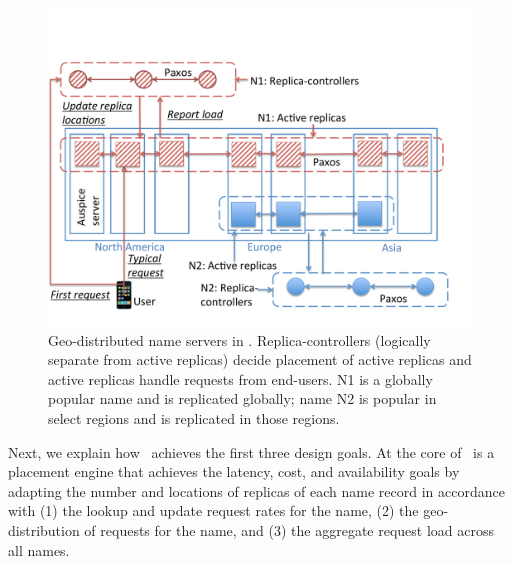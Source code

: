 \begin{figure}[t]
	\centering
	\vspace{-0.3in}
	\includegraphics[scale=0.33]{gns-dns/gnrs.pdf}
	\vspace{-0.15in}
	\caption{Geo-distributed name servers in \auspice.  Replica-controllers  (logically separate from active replicas) decide placement of active replicas and active replicas handle requests from end-users. N1 is a globally popular name and is replicated globally; name N2 is  popular in select regions and is replicated in those regions.}
	\vspace{-0.2in}
	\label{fig:auspice}
\end{figure}


Next, we explain how \auspice\ achieves the first three design goals. At the core of \auspice\ is a placement engine that achieves the latency, cost, and availability goals by adapting the number and locations of replicas of each name record in accordance with (1) the lookup and update request rates for the name, (2) the geo-distribution of requests for the name, and (3) the aggregate request load across all names. 



